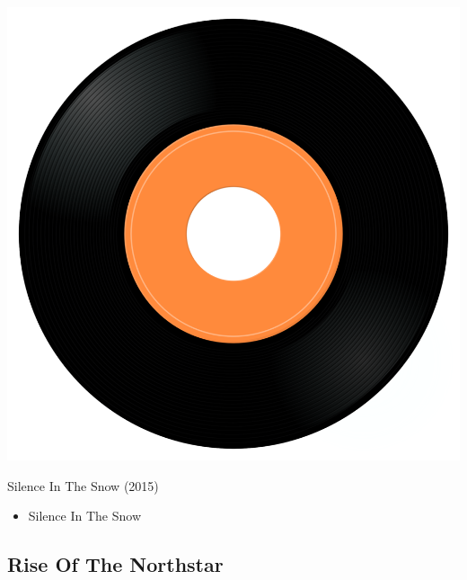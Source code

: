 \begin{minipage}[t]{0.25\textwidth}
\captionsetup{type=figure}
\includegraphics[width=\textwidth]{Images/cover.png}
\caption*{Silence In The Snow (2015)}
\end{minipage}
\begin{minipage}[t]{0.25\textwidth}\vspace{0pt}
\begin{itemize}[nosep,leftmargin=1em,labelwidth=*,align=left]
	\setlength{\itemsep}{0pt}
	\item Silence In The Snow
\end{itemize}
\end{minipage}

\subsection{Rise Of The Northstar}

